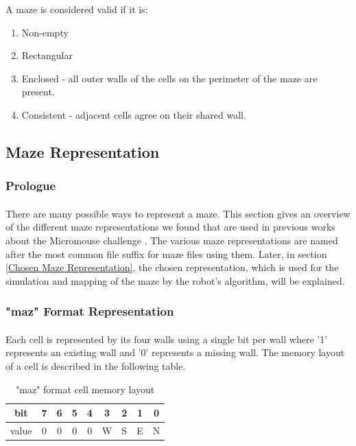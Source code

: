 \documentclass[12pt]{article}
\begin{document}
A \gls{maze} is considered valid if it is: 
\begin{enumerate}
    \item Non-empty
    \item Rectangular
    \item Enclosed - all outer walls of the \gls{cell}s on the perimeter of the \gls{maze} are present.
    \item Consistent - adjacent \gls{cell}s agree on their shared wall.
\end{enumerate}

\subsection{Maze Representation}
\subsubsection{Prologue}
\paragraph{}
There are many possible ways to represent a \gls{maze}.
This section gives an overview of the different \gls{maze} representations we found that are used in previous works about the \gls{Micromouse} challenge \cite{AD-Codex-Micromouse-C-Simulation-2022, jimenezjose-Micromouse-Simulator, mackorone-mms, vineetvb-micromouse}.
The various \gls{maze} representations are named after the most common file suffix for \gls{maze} files using them.
Later, in section \ref{Chosen Maze Representation}, the chosen representation, which is used for the simulation and mapping of the \gls{maze} by the robot's algorithm, will be explained.

\subsubsection{"maz" Format Representation} \label{maz-format}
\paragraph{}
Each \gls{cell} is represented by its four walls using a single bit per wall where '1' represents an existing wall and '0' represents a missing wall.
The memory layout of a \gls{cell} is described in the following table.

\begin{table}[H]
    \centering
    \begin{tabular}{ |c|c|c|c|c|c|c|c|c| }
    \hline
        bit & 7 & 6 & 5 & 4 & 3 & 2 & 1 & 0\\
    \hline
        value & 0 & 0 & 0 & 0 & W & S & E & N\\
    \hline
    \end{tabular}
    \caption{"maz" format \gls{cell} memory layout}
    \label{maz format cell memory}
\end{table}
\end{document}
